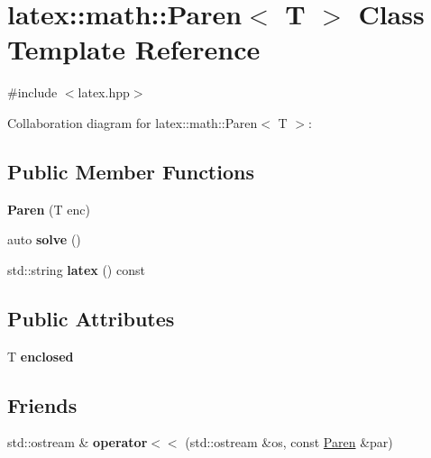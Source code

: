 \hypertarget{classlatex_1_1math_1_1Paren}{\section{latex\-:\-:math\-:\-:\-Paren$<$ \-T $>$ \-Class \-Template \-Reference}
\label{classlatex_1_1math_1_1Paren}
}


{\ttfamily \#include $<$latex.\-hpp$>$}



\-Collaboration diagram for latex\-:\-:math\-:\-:\-Paren$<$ \-T $>$\-:
\subsection*{\-Public \-Member \-Functions}
\begin{DoxyCompactItemize}
\item 
\hypertarget{classlatex_1_1math_1_1Paren_a92ee4e0a519162e5c81ee889fdffb6ac}{{\bfseries \-Paren} (\-T enc)}\label{classlatex_1_1math_1_1Paren_a92ee4e0a519162e5c81ee889fdffb6ac}

\item 
\hypertarget{classlatex_1_1math_1_1Paren_aa64116c67d309121e19040fb3677da6a}{auto {\bfseries solve} ()}\label{classlatex_1_1math_1_1Paren_aa64116c67d309121e19040fb3677da6a}

\item 
\hypertarget{classlatex_1_1math_1_1Paren_a1f98ca0b80126f3df1ac5343788790ca}{std\-::string {\bfseries latex} () const }\label{classlatex_1_1math_1_1Paren_a1f98ca0b80126f3df1ac5343788790ca}

\end{DoxyCompactItemize}
\subsection*{\-Public \-Attributes}
\begin{DoxyCompactItemize}
\item 
\hypertarget{classlatex_1_1math_1_1Paren_a629cccc17db6e7e25e4d57ccabc5320a}{\-T {\bfseries enclosed}}\label{classlatex_1_1math_1_1Paren_a629cccc17db6e7e25e4d57ccabc5320a}

\end{DoxyCompactItemize}
\subsection*{\-Friends}
\begin{DoxyCompactItemize}
\item 
\hypertarget{classlatex_1_1math_1_1Paren_afcb1b94ae8023cf02d56f708ee5d25ea}{std\-::ostream \& {\bfseries operator$<$$<$} (std\-::ostream \&os, const \hyperlink{classlatex_1_1math_1_1Paren}{\-Paren} \&par)}\label{classlatex_1_1math_1_1Paren_afcb1b94ae8023cf02d56f708ee5d25ea}

\end{DoxyCompactItemize}


